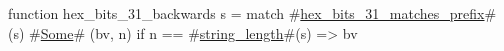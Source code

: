 function hex_bits_31_backwards s =
  match #\hyperref[sailRISCVzhexzybitszy31zymatcheszyprefix]{hex\_bits\_31\_matches\_prefix}#(s) {
      #\hyperref[sailRISCVzSome]{Some}# (bv, n) if n == #\hyperref[sailRISCVzstringzylength]{string\_length}#(s) => bv
  }
